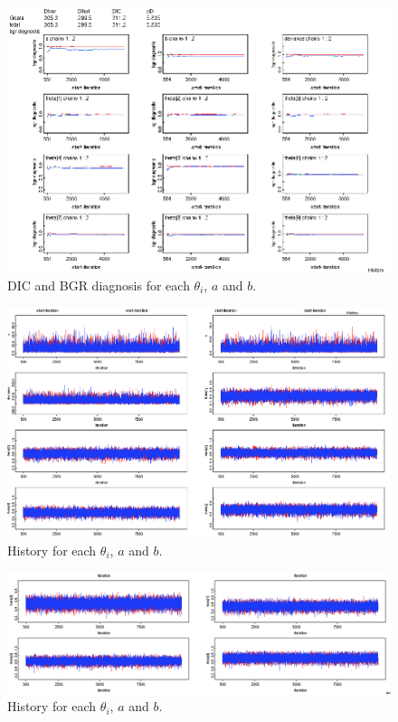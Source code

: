 \documentclass{article}
\begin{document}
  \begin{figure}[ht!]
  \centering
  \includegraphics[width=.8\textwidth]{imgs/M3a_1.png}
  \caption{DIC and BGR diagnosis for each $\theta_i$, $a$ and $b$.}
  \label{fig:fig7}
  \end{figure}
  \begin{figure}[ht!]
  \centering
  \includegraphics[width=.8\textwidth]{imgs/M3a_2.png}
  \caption{History for each $\theta_i$, $a$ and $b$.}
  \label{fig:fig8}
  \end{figure}
  \begin{figure}[ht!]
  \centering
  \includegraphics[width=.8\textwidth]{imgs/M3a_3.png}
  \caption{History for each $\theta_i$, $a$ and $b$.}
  \label{fig:fig9}
  \end{figure}
\end{document}

